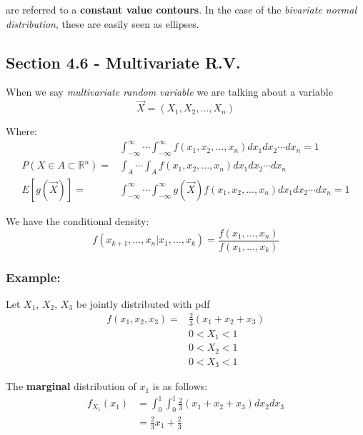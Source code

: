 \documentclass{article}
\begin{document}
\noindent are referred to a \textbf{constant value contours}. In the case of the \textit{bivariate normal distribution}, these are easily seen as ellipses.

\subsection{Section 4.6 - Multivariate R.V.}

When we say \textit{multivariate random variable} we are talking about a variable
\begin{equation*}
    \vec{X} = (X_1, X_2, ..., X_n)
\end{equation*}

\noindent Where:
\begin{equation*}
\begin{split}
    &\int_{-\infty}^\infty \cdots \int_{-\infty}^\infty f(x_1,x_2,...,x_n) dx_1 dx_2 \cdots dx_n = 1\\
    P\left(X \in A \subset \mathbb{R}^n\right) = &\int_A \cdots \int_A f(x_1,x_2,...,x_n) dx_1 dx_2 \cdots dx_n\\
    E[g(\vec{X})] = &\int_{-\infty}^\infty \cdots \int_{-\infty}^\infty g(\vec{X}) f(x_1,x_2,...,x_n) dx_1 dx_2 \cdots dx_n = 1
\end{split}
\end{equation*}

We have the conditional density:
\begin{equation*}
    f(x_{k+1},...,x_n | x_1,...,x_k) = \frac{f(x_1,...,x_n)}{f(x_1,...,x_k)}
\end{equation*}

\subsubsection*{Example:}
Let $X_1$, $X_2$, $X_3$ be jointly distributed with pdf
\begin{equation*}
    \begin{split}
        f(x_1,x_2,x_3) = &\frac{2}{3}(x_1+x_2+x_3)\\
        &0 < X_1 < 1\\
        &0 < X_2 < 1\\
        &0 < X_3 < 1
    \end{split}
\end{equation*}

The \textbf{marginal} distribution of $x_1$ is as follows:
\begin{equation*}
    \begin{split}
        f_{X_1}(x_1) &= \int_0^1 \int_0^1 \frac{2}{3}(x_1+x_2+x_3) dx_2 dx_3\\
        &= \frac{2}{3}x_1 + \frac{2}{3}
    \end{split}
\end{equation*}
\end{document}
